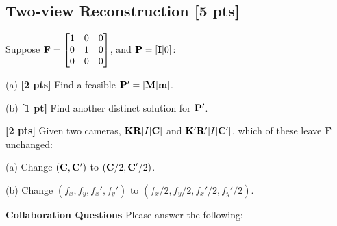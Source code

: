 \documentclass[11pt,addpoints,answers]{exam}
\numberwithin{equation}{section} %
\numberwithin{figure}{section} %
\numberwithin{table}{section} %
\begin{document}
\begin{questions}
\section{Two-view Reconstruction [5 pts]}

\question  Suppose $\mathbf{F} = \begin{bmatrix}
    1 & 0 & 0\\
    0 & 1 & 0\\
    0 & 0 & 0
\end{bmatrix}$, and $\mathbf{P} =[\mathbf{I} | 0 ]$:

(a) \textbf{[2 pts]} Find a feasible $\mathbf{P}' = [\mathbf{M} | \mathbf{m}]$.

(b) \textbf{[1 pt]} Find another distinct solution for $\mathbf{P}'$.

\begin{tcolorbox}[fit,height=5cm, width=\textwidth, blank, borderline={0.5pt}{-2pt},halign=left, valign=center, nobeforeafter]


\end{tcolorbox}

\question \textbf{[2 pts]} Given two cameras, $\mathbf{K}\mathbf{R}[I | \mathbf{C}]$ and $\mathbf{K}'\mathbf{R}'[I | \mathbf{C}']$, which of these leave $\mathbf{F}$ unchanged:

(a) Change $\left(\mathbf{C}, \mathbf{C}'\right)$ to $\left(\mathbf{C} / 2, \mathbf{C}' /2 \right)$.

(b) Change $\left(f_x, f_y, f_x', f_y'\right)$ to $\left(f_x/2, f_y/2, f_x'/2, f_y'/2\right)$.

\begin{tcolorbox}[fit,height=5cm, width=\textwidth, blank, borderline={0.5pt}{-2pt},halign=left, valign=center, nobeforeafter]


\end{tcolorbox}

\end{questions}

\clearpage

\textbf{Collaboration Questions} Please answer the following:
\end{document}
